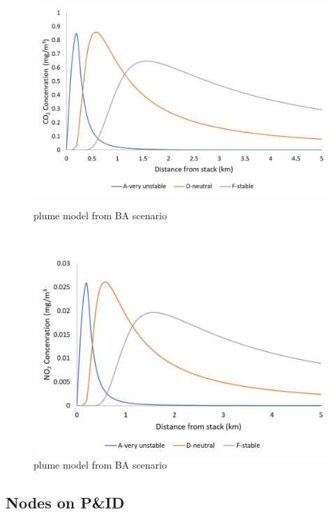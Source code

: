 \begin{figure}[h]
    \centering
    \begin{minipage}[t]{0.5\textwidth}
        \centering
        \includegraphics[width=\linewidth]{chapters/5-safety-layout-environment/figures/CO2plumeBA.jpg}
        \caption{ plume model from BA scenario}
        \label{fig:CO2plumeBA}
    \end{minipage}%
    ~ 
    \begin{minipage}[t]{0.5\textwidth}
        \centering
        \includegraphics[width=\linewidth]{chapters/5-safety-layout-environment/figures/NO2plumeBA.jpg}
        \caption{ plume model from BA scenario}
         \label{fig:NO2plumeBA}
    \end{minipage}
    
\end{figure}


\subsection{Nodes on P\&ID}
\label{app:nodes}

